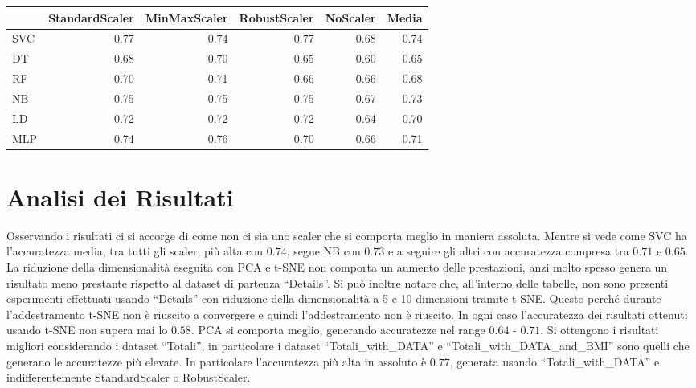 \documentclass[12pt,italian]{report}
\begin{document}
\begin{table}[h]
	\begin{center}
		\begin{adjustbox}{max width=\textwidth}
			\begin{tabular}{lrrrrr}
				\toprule
				{} &  StandardScaler &  MinMaxScaler &  RobustScaler &  NoScaler &  Media \\
				\midrule
				SVC &        \cellcolor{orange}0.77 &      0.74 &      \cellcolor{orange}0.77 &  0.68 &   0.74 \\
				DT  &        0.68 &      0.70 &      0.65 &  0.60 &   0.65 \\
				RF  &        0.70 &      0.71 &      0.66 &  0.66 &   0.68 \\
				NB  &        0.75 &      0.75 &      0.75 &  0.67 &   0.73 \\
				LD  &        0.72 &      0.72 &      0.72 &  0.64 &   0.70 \\
				MLP &        0.74 &      0.76 &      0.70 &  0.66 &   0.71 \\
				\bottomrule
			\end{tabular}
		\end{adjustbox}
	\end{center}
\end{table}


\section{Analisi dei  Risultati}
Osservando i risultati ci si accorge di come non ci sia uno scaler che si comporta meglio in maniera assoluta. Mentre si vede come SVC ha l'accuratezza media, tra tutti gli scaler, più alta con $0.74$, segue NB con $0.73$ e a seguire gli altri con accuratezza compresa tra $0.71$ e $0.65$.
La riduzione della dimensionalità eseguita con PCA e t-SNE non comporta un aumento delle prestazioni, anzi molto spesso genera un risultato meno prestante rispetto al dataset di partenza ``Details''. Si può inoltre notare che, all'interno delle tabelle, non sono presenti esperimenti effettuati usando ``Details'' con riduzione della dimensionalità a 5 e 10 dimensioni tramite t-SNE. Questo perché durante l'addestramento t-SNE non è riuscito a convergere e quindi l'addestramento non è riuscito.
In ogni caso l'accuratezza dei risultati ottenuti usando t-SNE non supera mai lo $0.58$. PCA si comporta meglio, generando accuratezze nel range $0.64$ - $0.71$.
Si ottengono i risultati migliori considerando i dataset ``Totali'', in particolare i dataset ``Totali\_with\_DATA'' e ``Totali\_with\_DATA\_and\_BMI'' sono quelli che generano le accuratezze più elevate. In particolare l'accuratezza più alta in assoluto è $0.77$, generata usando ``Totali\_with\_DATA'' e indifferentemente StandardScaler o RobustScaler.
\end{document}
